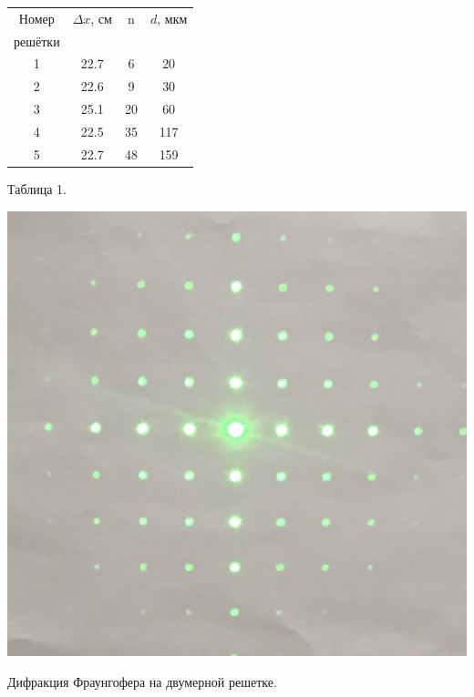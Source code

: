 \begin{minipage}{0.47\textwidth}
\begin{center}
\begin{tabular}{|c|c|c|c|}
\hline
Номер &$\Delta x$, см &  n&$d$, мкм\\
решётки&		&			& \\
\hline
1 &	22.7	&6	& 		20	\\
\hline
2&	22.6	&	9	&	30		\\
\hline
3&	25.1	&20		&	60		\\
\hline
4&	22.5	&	35	&	117		\\
\hline
5&	22.7	&	48	&		159	\\
\hline
\end{tabular}
\newline
\newline
Таблица 1. 
\end{center}
\end{minipage}
\begin{minipage}{0.47\textwidth}
\begin{center}
\includegraphics[width = \textwidth]{images/2.jpg}
\end{center}

\begin{center}
Дифракция Фраунгофера на двумерной решетке.
\end{center}
\end{minipage}




